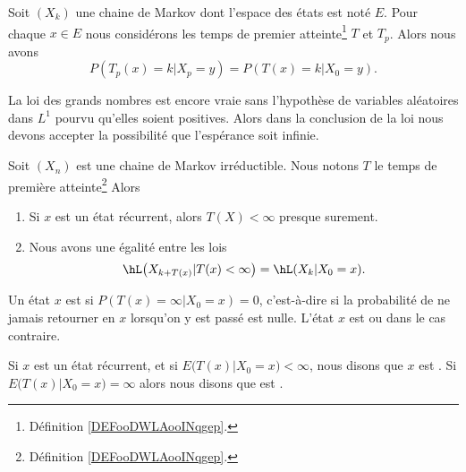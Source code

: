 \begin{lemma}       \label{LembyftKs}
	Soit \( (X_k)\) une chaine de Markov dont l'espace des états est noté \( E\). Pour chaque \( x\in E\) nous considérons les temps de premier atteinte\footnote{Définition \ref{DEFooDWLAooINqgep}.} \( T\) et \( T_p\). Alors nous avons
	\begin{equation}
		P(T_p(x)=k|X_p=y)=P(T(x)=k|X_0=y).
	\end{equation}
\end{lemma}

\begin{remark}
	La loi des grands nombres est encore vraie sans l'hypothèse de variables aléatoires dans \( L^1\) pourvu qu'elles soient positives. Alors dans la conclusion de la loi nous devons accepter la possibilité que l'espérance soit infinie.
\end{remark}

\begin{proposition} \label{PropMrkIrreLoishLCkpjkptXk}
	Soit \( (X_n)\) est une chaine de Markov irréductible. Nous notons \( T\) le temps de première atteinte\footnote{Définition \ref{DEFooDWLAooINqgep}.} Alors
	\begin{enumerate}
		\item
		      Si \( x\) est un état récurrent, alors \( T(X)<\infty\) presque surement.
		\item
		      Nous avons une égalité entre les lois
		      \begin{equation}    \label{PropMrkIrreLoishLCkpjkptXkItemii}
			      \hL\big( X_{k+T(x)}|T(x)<\infty \big)=\hL(X_k|X_0=x).
		      \end{equation}
	\end{enumerate}
\end{proposition}

\begin{definition}\label{DefWknULk}
	Un état \( x\) est  si \( P(T(x)=\infty|X_0=x)=0\), c'est-à-dire si la probabilité de ne jamais retourner en \( x\) lorsqu'on y est passé est nulle. L'état \( x\) est  ou  dans le cas contraire.

	Si \( x\) est un état récurrent, et si \( E\big( T(x)|X_0=x \big)<\infty\), nous disons que \( x\) est . Si \( E\big( T(x)|X_0=x \big)=\infty\) alors nous disons que est .
\end{definition}


